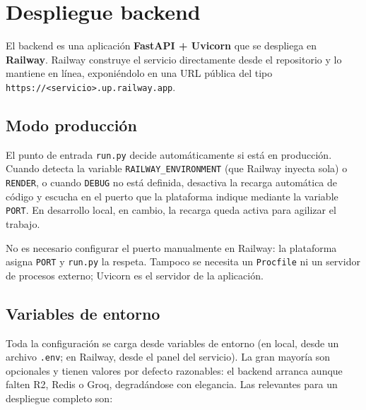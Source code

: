 \section{Despliegue backend}
\label{sec:deploy_backend}

El backend es una aplicación \textbf{FastAPI + Uvicorn} que se despliega en \textbf{Railway}. Railway construye el servicio directamente desde el repositorio y lo mantiene en línea, exponiéndolo en una URL pública del tipo \texttt{https://<servicio>.up.railway.app}.

\subsection*{Modo producción}

El punto de entrada \texttt{run.py} decide automáticamente si está en producción. Cuando detecta la variable \texttt{RAILWAY\_ENVIRONMENT} (que Railway inyecta sola) o \texttt{RENDER}, o cuando \texttt{DEBUG} no está definida, desactiva la recarga automática de código y escucha en el puerto que la plataforma indique mediante la variable \texttt{PORT}. En desarrollo local, en cambio, la recarga queda activa para agilizar el trabajo.

\begin{remark}
No es necesario configurar el puerto manualmente en Railway: la plataforma asigna \texttt{PORT} y \texttt{run.py} la respeta. Tampoco se necesita un \texttt{Procfile} ni un servidor de procesos externo; Uvicorn es el servidor de la aplicación.
\end{remark}

\subsection*{Variables de entorno}

Toda la configuración se carga desde variables de entorno (en local, desde un archivo \texttt{.env}; en Railway, desde el panel del servicio). La gran mayoría son opcionales y tienen valores por defecto razonables: el backend arranca aunque falten R2, Redis o Groq, degradándose con elegancia. Las relevantes para un despliegue completo son:

